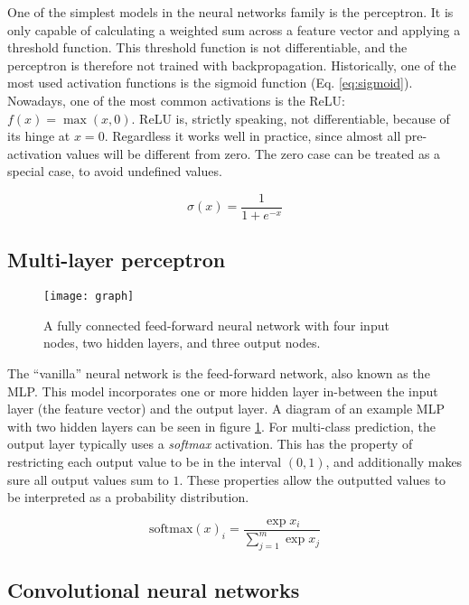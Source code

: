 One of the simplest models in the neural networks family is the perceptron.
It is only capable of calculating a weighted sum across a feature vector and
applying a threshold function. This threshold function is not differentiable,
and the perceptron is therefore not trained with backpropagation.
Historically, one of the most used activation functions is the sigmoid
function (Eq. \ref{eq:sigmoid}). Nowadays, one of the most
common activations is the \ac{ReLU}: \(f(x) = \max(x, 0)\). \ac{ReLU} is,
strictly speaking, not differentiable, because of its hinge at $x = 0$.
Regardless it works well in practice, since almost all pre-activation values
will be different from zero. The zero case can be treated as a special case,
to avoid undefined values.

\begin{equation} \label{eq:sigmoid}
  \sigma(x) = {\frac{1}{1 + e^{-x}}}
\end{equation}

\subsection{Multi-layer perceptron}

\begin{figure}
  \centering
  \texttt{[image: graph]}
  \caption[Illustration of a feed-forward neural network]{
    A fully connected feed-forward neural network with four input
    nodes, two hidden layers, and three output nodes.
  }
  \label{fig:mlp-diagram}
\end{figure}

The ``vanilla'' neural network is the feed-forward network, also known as the
\ac{MLP}. This model incorporates one or more
hidden layer in-between the input layer (the feature vector) and the output
layer. A diagram of an example \ac{MLP} with two hidden layers can be seen in
figure \ref{fig:mlp-diagram}. For multi-class prediction, the output layer
typically uses a \emph{softmax} activation. This has the property of
restricting each output value to be in the interval $(0,1)$, and additionally
makes sure all output values sum to $1$. These properties allow the outputted
values to be interpreted as a probability distribution.

\begin{equation}\label{eq:softmax}
  \mathrm{softmax}(x)_i = \frac{\exp{x_i}}{\sum_{j=1}^{m}\exp{x_j}}
\end{equation}


\subsection{Convolutional neural networks}

